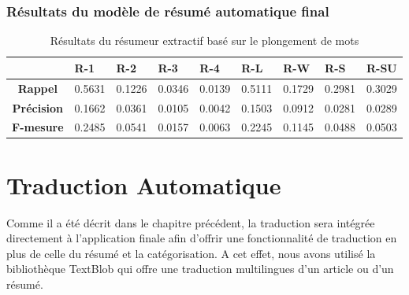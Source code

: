         \subsubsection{Résultats du modèle de résumé automatique final}
        \begin{table}[H]
            \begin{center}
                \begin{tabular}{|c|C{1.2cm}|C{1.2cm}|C{1.2cm}|C{1.2cm}|C{1.2cm}|C{1.2cm}|C{1.2cm}|C{1.2cm}|}
                     & \textbf{R-1} &  \textbf{R-2} &  \textbf{R-3} &  \textbf{R-4} &  \textbf{R-L} &  \textbf{R-W} &  \textbf{R-S} &  \textbf{R-SU} \\
                    \hline
                    \textbf{Rappel} & 0.5631 & 0.1226 & 0.0346 & 0.0139 & 0.5111 & 0.1729 & 0.2981 & 0.3029 \\
                    \hline
                    \textbf{Précision} & 0.1662 & 0.0361 & 0.0105 & 0.0042 & 0.1503 & 0.0912 & 0.0281 & 0.0289 \\
                    \hline
                    \textbf{F-mesure} & 0.2485 & 0.0541 & 0.0157 & 0.0063 & 0.2245 & 0.1145 & 0.0488 & 0.0503 \\
                    \hline
                \end{tabular}
             \end{center}
            \caption{Résultats du résumeur extractif basé sur le plongement de mots}
            \label{result-boltzman}
        \end{table}

\section{Traduction Automatique}
Comme il a été décrit dans le chapitre précédent, la traduction sera intégrée directement à l'application finale afin d'offrir une fonctionnalité de traduction en plus de celle du résumé et la catégorisation. A cet effet, nous avons utilisé la bibliothèque TextBlob qui offre une traduction multilingues d'un article ou d'un résumé.
